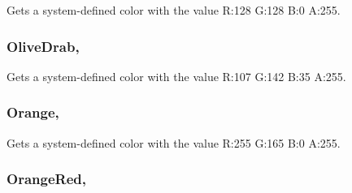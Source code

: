 Gets a system-\/defined color with the value R\+:128 G\+:128 B\+:0 A\+:255.

\hypertarget{structMicrosoft_1_1Xna_1_1Framework_1_1Color_af809aa015c1b6e2e4715aece8b00f532}{}
\subsubsection[{Olive\+Drab}]{ Olive\+Drab\hspace{0.3cm}{\ttfamily [static]}, {\ttfamily [get]}}\label{structMicrosoft_1_1Xna_1_1Framework_1_1Color_af809aa015c1b6e2e4715aece8b00f532}


Gets a system-\/defined color with the value R\+:107 G\+:142 B\+:35 A\+:255.

\hypertarget{structMicrosoft_1_1Xna_1_1Framework_1_1Color_ad18a56cc64968052ba629f56402ea94e}{}
\subsubsection[{Orange}]{ Orange\hspace{0.3cm}{\ttfamily [static]}, {\ttfamily [get]}}\label{structMicrosoft_1_1Xna_1_1Framework_1_1Color_ad18a56cc64968052ba629f56402ea94e}


Gets a system-\/defined color with the value R\+:255 G\+:165 B\+:0 A\+:255.

\hypertarget{structMicrosoft_1_1Xna_1_1Framework_1_1Color_a1c07e6afd0554a2aab685a1643af7993}{}
\subsubsection[{Orange\+Red}]{ Orange\+Red\hspace{0.3cm}{\ttfamily [static]}, {\ttfamily [get]}}\label{structMicrosoft_1_1Xna_1_1Framework_1_1Color_a1c07e6afd0554a2aab685a1643af7993}


